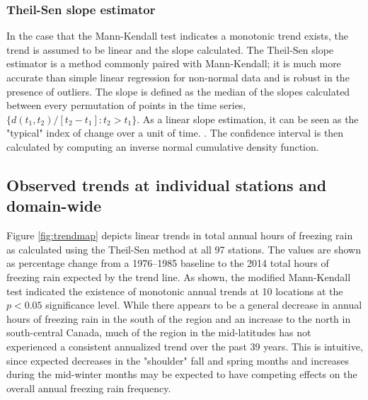 \documentclass[twocol]{ametsoc}
\begin{document}
\subsubsection{Theil-Sen slope estimator}
In the case that the Mann-Kendall test indicates a monotonic trend exists, the trend is assumed to be linear and the slope calculated. The Theil-Sen slope estimator is a method commonly paired with Mann-Kendall; it is much more accurate than simple linear regression for non-normal data and is robust in the presence of outliers. The slope is defined as the median of the slopes calculated between every permutation of points in the time series, $\{d(t_1,t_2)/[t_2-t_1]:t_2>t_1\}$. As a linear slope estimation, it can be seen as the "typical" index of change over a unit of time. \citep{chandler2011statistical}. The confidence interval is then calculated by computing an inverse normal cumulative density function.

\subsection{Observed trends at individual stations and domain-wide}


Figure \ref{fig:trendmap} depicts linear trends in total annual hours of freezing rain as calculated using the Theil-Sen method at all 97 stations. The values are shown as percentage change from a 1976--1985 baseline to the 2014 total hours of freezing rain expected by the trend line. As shown, the modified Mann-Kendall test indicated the existence of monotonic annual trends at 10 locations at the $p<0.05$ significance level. While there appears to be a general decrease in annual hours of freezing rain in the south of the region and an increase to the north in south-central Canada, much of the region in the mid-latitudes has not experienced a consistent annualized trend over the past 39 years. This is intuitive, since expected decreases in the "shoulder" fall and spring months and increases during the mid-winter months may be expected to have competing effects on the overall annual freezing rain frequency.
\end{document}
